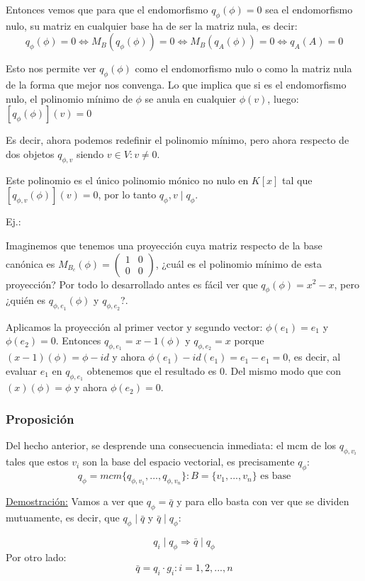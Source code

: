 \documentclass[10pt,a4paper,openright]{book}
\begin{document}
Entonces vemos que para que el endomorfismo $q_\phi(\phi) = 0$ sea el endomorfismo nulo, su matriz en cualquier base ha de ser la matriz nula, es decir:
$$q_\phi (\phi)=0\Leftrightarrow M_B(q_\phi(\phi))= 0\Leftrightarrow M_B(q_A(\phi))=0 \Leftrightarrow q_A(A)=0$$


Esto nos permite ver $q_\phi(\phi)$ como el endomorfismo nulo o como la matriz nula de la forma que mejor nos convenga. Lo que implica que si es el endomorfismo nulo, el polinomio mínimo de $\phi$ se anula en cualquier $\phi(v)$, luego: $[q_\phi(\phi)](v)=0$

Es decir, ahora podemos redefinir el polinomio mínimo, pero ahora respecto de dos objetos $q_{\phi, v}$ siendo $v\in V: v\neq 0$.

Este polinomio es el único polinomio mónico no nulo en $K[x]$ tal que $[q_{\phi,v}(\phi)](v)=0$, por lo tanto $q_\phi,v\mid q_\phi$.

Ej.:

Imaginemos que tenemos una proyección cuya matriz respecto de la base canónica es $M_{B_c}(\phi)=\begin{pmatrix} 1 & 0 \\ 0 & 0\end{pmatrix}$, ¿cuál es el polinomio mínimo de esta proyección? Por todo lo desarrollado antes es fácil ver que $q_\phi(\phi)= x^2-x$, pero ¿quién es $q_{\phi,e_1}(\phi)$ y $q_{\phi, e_2}$?.

Aplicamos la proyección al primer vector y segundo vector: $\phi(e_1)=e_1$ y $\phi(e_2)=0$. Entonces $q_{\phi,e_1}=x-1(\phi)$ y $q_{\phi, e_2}=x$ porque $(x-1)(\phi)=\phi-id$ y ahora $\phi(e_1)-id(e_1)=e_1-e_1=0$, es decir, al evaluar $e_1$ en $q_{\phi,e_1}$ obtenemos que el resultado es 0. Del mismo modo que con $(x)(\phi)=\phi$ y ahora $\phi(e_2)=0$.

\subsubsection*{Proposición}
Del hecho anterior, se desprende una consecuencia inmediata: el mcm de los $q_{\phi,v_i}$ tales que estos $v_i$ son la base del espacio vectorial, es precisamente $q_\phi$:
$$q_\phi = mcm\{q_{\phi, v_1}, ..., q_{\phi, v_n}\}: B=\{v_1, ..., v_n\} \mbox{ es base}$$

\underline{Demostración:}
Vamos a ver que $q_\phi = \bar{q}$ y para ello basta con ver que se dividen mutuamente, es decir, que $q_\phi \mid \bar{q}$ y $\bar{q}\mid q_\phi$: 

$$q_i\mid q_\phi\Rightarrow \bar{q}\mid q_\phi$$
Por otro lado:
$$\bar{q}= q_i\cdot g_i: i=1,2,...,n$$
\end{document}
